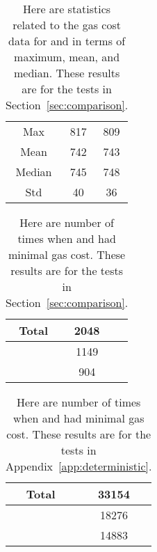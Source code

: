 \begin{table}[p]
\centering
\begin{tabular}{|c||S[table-format=3.0]|S[table-format=3.0]|}
\hline
    & \UnrolledThree{} & \UnrolledThreeV{} \\
\hline
Max    &                       817 &  809 \\
Mean   &  742 & 743 \\
Median &  745 & 748 \\
Std    &                        40 &  36 \\
\hline
\end{tabular}
\caption[Gas Costs Statistics 3]{Here are statistics
    related to the gas cost data for \UnrolledThree{} and \UnrolledThreeV{}
    in terms of maximum, mean, and median.
    These results are for the tests in Section~\ref{sec:comparison}.
    }
\label{table:gas_costs_unrolled3}
\end{table}

\begin{table}[p]
\centering
\begin{tabular}{|c|S[table-format=4.0]|S[table-format=4.0]|}
\hline
Total & 2048 \\
\hline
{} \UnrolledThree{} &  1149 \\
\UnrolledThreeV{} & 904 \\
\hline
\end{tabular}
\caption[Minimal Gas Costs Statistics]{Here are number of times
    when \UnrolledThree{} and \UnrolledThreeV{}
    had minimal gas cost.
    These results are for the tests in Section~\ref{sec:comparison}.
    }
\label{table:minimal_gas_costs_unrolled3}
\end{table}

\begin{table}[p]
\centering
\begin{tabular}{|c|S[table-format=5.0]|}
\hline
Total & 33154 \\
\hline
{} \UnrolledThree{} &  18276 \\
\UnrolledThreeV{} & 14883 \\
\hline
\end{tabular}
\caption[Minimal Gas Costs Statistics]{Here are number of times
    when \UnrolledThree{} and \UnrolledThreeV{}
    had minimal gas cost.
    These results are for the tests in Appendix~\ref{app:deterministic}.
    }
\label{table:minimal_gas_costs_ed_unrolled3}
\end{table}


